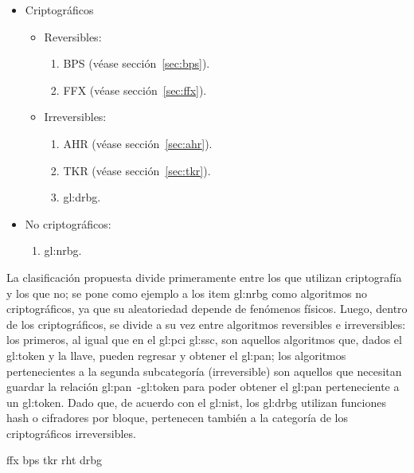 \begin{itemize}
  \item{Criptográficos}
    \begin{itemize}
      \item Reversibles:
        \begin{enumerate}
          \item BPS (véase sección~\ref{sec:bps}).
          \item FFX (véase sección~\ref{sec:ffx}).
        \end{enumerate}
      \item Irreversibles:
        \begin{enumerate}
          \item AHR (véase sección~\ref{sec:ahr}).
          \item TKR (véase sección~\ref{sec:tkr}).
          \item \gls{gl:drbg}.
        \end{enumerate}
    \end{itemize}
  \item No criptográficos:
    \begin{enumerate}
      \item \gls{gl:nrbg}.
    \end{enumerate}
\end{itemize}

La clasificación propuesta divide primeramente entre los que utilizan
criptografía y los que no; se pone como ejemplo a los item \gls{gl:nrbg} como
algoritmos no criptográficos, ya que su aleatoriedad depende de fenómenos físicos.
Luego, dentro de los criptográficos, se divide a su vez entre algoritmos
reversibles e irreversibles: los primeros, al igual que en el
\gls{gl:pci} \gls{gl:ssc}, son aquellos algoritmos que, dados el \gls{gl:token}
y la llave, pueden regresar y obtener el \gls{gl:pan}; los algoritmos
pertenecientes a la segunda subcategoría (irreversible) son aquellos que
necesitan guardar la relación \gls{gl:pan}~-\gls{gl:token} para poder obtener
el \gls{gl:pan} perteneciente a un \gls{gl:token}. Dado que, de acuerdo con el
\gls{gl:nist}, los \gls{gl:drbg} utilizan funciones hash o cifradores por
bloque, pertenecen también a la categoría de los criptográficos irreversibles.

{ffx}
{bps}
{tkr}
{rht}
{drbg}
